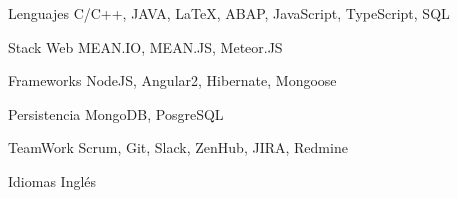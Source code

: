 


\begin{cvskills}


\cvskill
{Lenguajes} %
{C/C++, JAVA, \LaTeX{}, ABAP, JavaScript, TypeScript, SQL} %


\cvskill
{Stack Web} %
{MEAN.IO, MEAN.JS, Meteor.JS} %

\cvskill
{Frameworks} %
{NodeJS, Angular2, Hibernate, Mongoose} %


\cvskill
{Persistencia} %
{MongoDB, PosgreSQL} %

\cvskill
{TeamWork} %
{Scrum, Git, Slack, ZenHub, JIRA, Redmine} %

\cvskill
{Idiomas} %
{Inglés} %


\end{cvskills}
